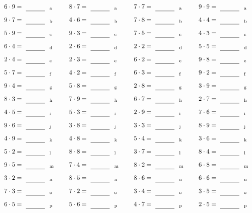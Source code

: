 \documentclass
[
  draft    = true,
  fontsize = 11pt,
  parskip  = half-
]
{scrartcl}
\begin{document}
\par\vfill\par
\begin{align*}
    \pline{6\cdot9}&=\rline{a}
  & \pline{8\cdot7}&=\rline{a}
  & \pline{7\cdot7}&=\rline{a}
  & \pline{9\cdot9}&=\rline{a} \\[1ex]
    \pline{9\cdot7}&=\rline{b}
  & \pline{4\cdot6}&=\rline{b}
  & \pline{7\cdot8}&=\rline{b}
  & \pline{4\cdot4}&=\rline{b} \\[1ex]
    \pline{5\cdot9}&=\rline{c}
  & \pline{9\cdot3}&=\rline{c}
  & \pline{7\cdot5}&=\rline{c}
  & \pline{4\cdot3}&=\rline{c} \\[1ex]
    \pline{6\cdot4}&=\rline{d}
  & \pline{2\cdot6}&=\rline{d}
  & \pline{2\cdot2}&=\rline{d}
  & \pline{5\cdot5}&=\rline{d} \\[1ex]
    \pline{2\cdot4}&=\rline{e}
  & \pline{2\cdot3}&=\rline{e}
  & \pline{6\cdot2}&=\rline{e}
  & \pline{9\cdot8}&=\rline{e} \\[1ex]
    \pline{5\cdot7}&=\rline{f}
  & \pline{4\cdot2}&=\rline{f}
  & \pline{6\cdot3}&=\rline{f}
  & \pline{9\cdot2}&=\rline{f} \\[1ex]
    \pline{9\cdot4}&=\rline{g}
  & \pline{5\cdot8}&=\rline{g}
  & \pline{2\cdot8}&=\rline{g}
  & \pline{3\cdot9}&=\rline{g} \\[1ex]
    \pline{8\cdot3}&=\rline{h}
  & \pline{7\cdot9}&=\rline{h}
  & \pline{6\cdot7}&=\rline{h}
  & \pline{2\cdot7}&=\rline{h} \\[1ex]
    \pline{4\cdot5}&=\rline{i}
  & \pline{5\cdot3}&=\rline{i}
  & \pline{2\cdot9}&=\rline{i}
  & \pline{7\cdot6}&=\rline{i} \\[1ex]
    \pline{9\cdot6}&=\rline{j}
  & \pline{3\cdot8}&=\rline{j}
  & \pline{3\cdot3}&=\rline{j}
  & \pline{8\cdot9}&=\rline{j} \\[1ex]
    \pline{4\cdot9}&=\rline{k}
  & \pline{4\cdot8}&=\rline{k}
  & \pline{5\cdot4}&=\rline{k}
  & \pline{3\cdot6}&=\rline{k} \\[1ex]
    \pline{5\cdot2}&=\rline{l}
  & \pline{8\cdot8}&=\rline{l}
  & \pline{3\cdot7}&=\rline{l}
  & \pline{8\cdot4}&=\rline{l} \\[1ex]
    \pline{9\cdot5}&=\rline{m}
  & \pline{7\cdot4}&=\rline{m}
  & \pline{8\cdot2}&=\rline{m}
  & \pline{6\cdot8}&=\rline{m} \\[1ex]
    \pline{3\cdot2}&=\rline{n}
  & \pline{8\cdot5}&=\rline{n}
  & \pline{8\cdot6}&=\rline{n}
  & \pline{6\cdot6}&=\rline{n} \\[1ex]
    \pline{7\cdot3}&=\rline{o}
  & \pline{7\cdot2}&=\rline{o}
  & \pline{3\cdot4}&=\rline{o}
  & \pline{3\cdot5}&=\rline{o} \\[1ex]
    \pline{6\cdot5}&=\rline{p}
  & \pline{5\cdot6}&=\rline{p}
  & \pline{4\cdot7}&=\rline{p}
  & \pline{2\cdot5}&=\rline{p}
\end{align*}
\end{document}
